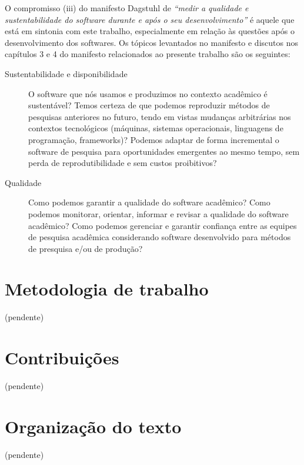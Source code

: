 O compromisso (iii) do manifesto Dagstuhl \cite{allen2017engineering} de {\it
``medir a qualidade e sustentabilidade do software durante e após o seu
desenvolvimento''} é aquele que está em sintonia com este trabalho,
especialmente em relação às questões após o desenvolvimento dos softwares.
Os tópicos levantados no manifesto e discutos nos capítulos 3 e 4 do manifesto
relacionados ao presente trabalho são os seguintes:

\begin{description}

  \item [Sustentabilidade e disponibilidade]

    O software que nós usamos e produzimos no contexto acadêmico é sustentável?
    Temos certeza de que podemos reproduzir métodos de pesquisas anteriores no
    futuro, tendo em vistas mudanças arbitrárias nos contextos tecnológicos
    (máquinas, sistemas operacionais, linguagens de programação, frameworks)?
    Podemos adaptar de forma incremental o software de pesquisa para
    oportunidades emergentes ao mesmo tempo, sem perda de reprodutibilidade e
    sem custos proibitivos?

  \item [Qualidade]

    Como podemos garantir a qualidade do software acadêmico? Como podemos
    monitorar, orientar, informar e revisar a qualidade do software acadêmico?
    Como podemos gerenciar e garantir confiança entre as equipes de pesquisa
    acadêmica considerando software desenvolvido para métodos de presquisa e/ou
    de produção?

\end{description}

\section{Metodologia de trabalho}

(pendente)

\section{Contribuições}

(pendente)

\section{Organização do texto}

(pendente)
